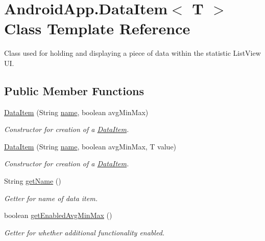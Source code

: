 \hypertarget{class_android_app_1_1_data_item}{}\section{Android\+App.\+Data\+Item$<$ T $>$ Class Template Reference}
\label{class_android_app_1_1_data_item}


Class used for holding and displaying a piece of data within the statistic List\+View UI.  


\subsection*{Public Member Functions}
\begin{DoxyCompactItemize}
\item 
\hyperlink{class_android_app_1_1_data_item_a11dd3418028a213466ac1c075120de57}{Data\+Item} (String \hyperlink{class_android_app_1_1_data_item_a7e6d01c4d449403e707e99fce240b33b}{name}, boolean avg\+Min\+Max)
\begin{DoxyCompactList}\small\item\em Constructor for creation of a \hyperlink{class_android_app_1_1_data_item}{Data\+Item}. \end{DoxyCompactList}\item 
\hyperlink{class_android_app_1_1_data_item_a46a1d40afefec40e043301faefab4670}{Data\+Item} (String \hyperlink{class_android_app_1_1_data_item_a7e6d01c4d449403e707e99fce240b33b}{name}, boolean avg\+Min\+Max, T value)
\begin{DoxyCompactList}\small\item\em Constructor for creation of a \hyperlink{class_android_app_1_1_data_item}{Data\+Item}. \end{DoxyCompactList}\item 
String \hyperlink{class_android_app_1_1_data_item_adb968324854c42160f10bcf4ad05eec2}{get\+Name} ()
\begin{DoxyCompactList}\small\item\em Getter for name of data item. \end{DoxyCompactList}\item 
boolean \hyperlink{class_android_app_1_1_data_item_a45f09cabd91cc7032357b02bb0498c3e}{get\+Enabled\+Avg\+Min\+Max} ()
\begin{DoxyCompactList}\small\item\em Getter for whether additional functionality enabled. \end{DoxyCompactList}\item 

\end{DoxyCompactItemize}
